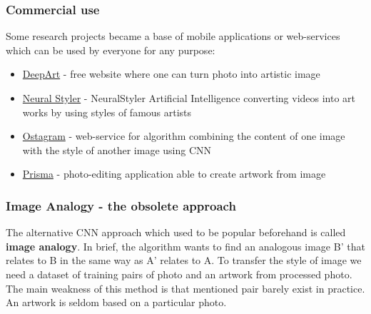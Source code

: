\documentclass[../Main.tex]{subfiles}
\begin{document}
    \subsubsection{Commercial use}
    Some research projects became a base of mobile applications or web-services which can be used by everyone for any purpose:
    \begin{itemize}
        \item \href{https://deepart.io}{DeepArt} - free website where one can turn photo into artistic image
        \item \href{http://neuralstyler.com}{Neural Styler} - NeuralStyler Artificial Intelligence converting videos into art works by using styles of famous artists
        \item \href{https://www.ostagram.me/static_pages/lenta?last_days=1000&locale=en}{Ostagram} - web-service for algorithm combining the content of one image with the style of another image using CNN
        \item \href{https://prisma-ai.com}{Prisma} - photo-editing application able to create artwork from image
    \end{itemize}

    
    \subsubsection{Image Analogy - the obsolete approach}
    The alternative CNN approach which used to be popular beforehand is called \textbf{image analogy}. In brief, the algorithm wants to find an analogous image B' that relates to B in the same way as A' relates to A.  To transfer the style of image we need a dataset of training pairs of photo and an artwork from processed photo. The main weakness of this method is that mentioned pair barely exist in practice. An artwork is seldom based on a particular photo.
\end{document}
